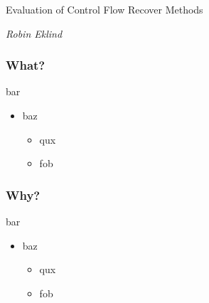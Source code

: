 \documentclass[aspectratio=1610]{beamer}
\begin{document}

\startpage

\begin{frame}

	\vspace{0.02\textheight}

	\begin{Large}
		Evaluation of Control Flow Recover Methods
	\end{Large}

	\vspace{0.1\textheight}

	\begin{small}
		\textit{Robin Eklind}
	\end{small}
\end{frame}






\normalpage

\begin{frame}
	\frametitle{What?}

	\begin{block}{bar}
		\begin{itemize}
			\item baz
			\begin{itemize}
				\item qux
				\item fob
			\end{itemize}
		\end{itemize}
	\end{block}
\end{frame}




\begin{frame}
	\frametitle{Why?}

	\begin{block}{bar}
		\begin{itemize}
			\item baz
			\begin{itemize}
				\item qux
				\item fob
			\end{itemize}
		\end{itemize}
	\end{block}
\end{frame}
\end{document}
